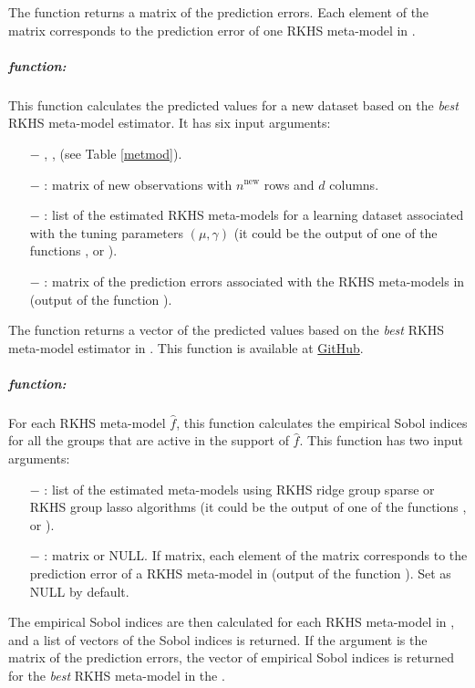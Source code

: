 The function  returns a matrix of the prediction errors. Each element of the matrix corresponds to the prediction error of one RKHS meta-model in .
\subparagraph*{ function:} 
This function calculates the predicted values for a new dataset based on the \textit{best} RKHS meta-model estimator. It has six input arguments:
\begin{itemize}
\item[$-$] , ,  (see Table \ref{metmod}).
\item[$-$] : matrix of new observations with $n^{\text{new}}$ rows and $d$ columns.
\item[$-$] : list of the estimated RKHS meta-models for a learning dataset associated with the tuning parameters $(\mu,\gamma)$ (it could be the output of one of the functions ,  or ).
\item[$-$] : matrix of the prediction errors associated with the RKHS meta-models in  (output of the function ).
\end{itemize}
The function  returns a vector of the predicted values based on the \textit{best} RKHS meta-model estimator in . This function is available at \href{https://github.com/halalehkamari/RKHSMetaMod}{GitHub}.
\subparagraph*{ function:} For each RKHS meta-model $\widehat{f}$, this function calculates the empirical Sobol indices for all the groups that are active in the support of $\widehat{f}$. This function has two input arguments:
\begin{itemize}
\item[$-$] : list of the estimated meta-models using RKHS ridge group sparse or RKHS group lasso algorithms (it could be the output of one of the functions ,  or ).
\item[$-$] : matrix or NULL. If matrix, each element of the matrix corresponds to the prediction error of a RKHS meta-model in  (output of the function ). Set as NULL by default.
\end{itemize}
The empirical Sobol indices are then calculated for each RKHS meta-model in , and a list of vectors of the Sobol indices is returned.
If the argument  is the matrix of the prediction errors, the vector of empirical Sobol indices is returned for the \textit{best} RKHS meta-model in the .
\vspace{0.3cm} 


